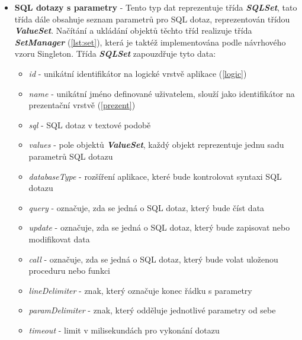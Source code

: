 \documentclass[czech,bachelor,public,dept460,male,cpdeclaration,twoside]{diploma}
\begin{document}
\begin{itemize}
  \item \textbf{SQL dotazy s parametry} - Tento typ dat reprezentuje třída \textbf{\emph{SQLSet}}, tato třída dále obsahuje seznam parametrů pro SQL dotaz, reprezentován třídou \textbf{\emph{ValueSet}}. Načítání a ukládání objektů těchto tříd realizuje třída \textbf{\emph{SetManager}} (\ref{lst:set}), která je taktéž implementována podle návrhového vzoru Singleton. Třída \textbf{\emph{SQLSet}} zapouzdřuje tyto data:
    \begin{itemize}
  	\item \textit{id} - unikátní identifikátor na logické vrstvě aplikace (\ref{logic})
  	\item \textit{name} - unikátní jméno definované uživatelem, slouží jako identifikátor na prezentační vrstvě (\ref{prezent})
  	\item \textit{sql} - SQL dotaz v textové podobě
  	\item \textit{values} - pole objektů \textbf{\emph{ValueSet}}, každý objekt reprezentuje jednu sadu parametrů SQL dotazu
  	\item \textit{databaseType} - rozšíření aplikace, které bude kontrolovat syntaxi SQL dotazu
  	\item \textit{query} - označuje, zda se jedná o SQL dotaz, který bude číst data
  	\item \textit{update} - označuje, zda se jedná o SQL dotaz, který bude zapisovat nebo modifikovat data
  	\item \textit{call} - označuje, zda se jedná o SQL dotaz, který bude volat uloženou proceduru nebo funkci
  	\item \textit{lineDelimiter} - znak, který označuje konec řádku s parametry
  	\item \textit{paramDelimiter} - znak, který odděluje jednotlivé parametry od sebe
  	\item \textit{timeout} - limit v milisekundách pro vykonání dotazu
  \end{itemize}
  

\end{itemize}
\end{document}
